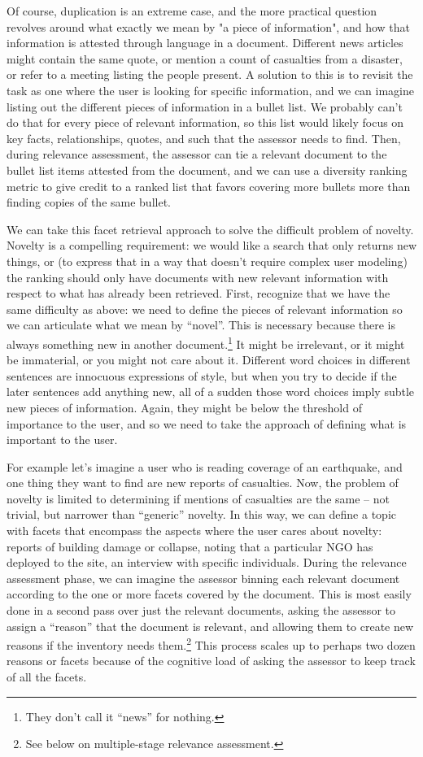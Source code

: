 \documentclass[nobib]{tufte-book}
\begin{document}
Of course, duplication is an extreme case, and the more practical question revolves around what exactly we mean by "a piece of information", and how that information is attested through language in a document.  Different news articles might contain the same quote, or mention a count of casualties from a disaster, or refer to a meeting listing the people present.  A solution to this is to revisit the task as one where the user is looking for specific information, and we can imagine listing out the different pieces of information in a bullet list.  We probably can't do that for every piece of relevant information, so this list would likely focus on key facts, relationships, quotes, and such that the assessor needs to find.  Then, during relevance assessment, the assessor can tie a relevant document to the bullet list items attested from the document, and we can use a diversity ranking metric to give credit to a ranked list that favors covering more bullets more than finding copies of the same bullet.

We can take this facet retrieval approach to solve the difficult problem of novelty.  Novelty is a compelling requirement: we would like a search that only returns new things, or (to express that in a way that doesn't require complex user modeling) the ranking should only have documents with new relevant information with respect to what has already been retrieved.  First, recognize that we have the same difficulty as above: we need to define the pieces of relevant information so we can articulate what we mean by ``novel''.  This is necessary because there is always something new in another document.\footnote{They don't call it ``news'' for nothing.}  It might be irrelevant, or it might be immaterial, or you might not care about it.  Different word choices in different sentences are innocuous expressions of style, but when you try to decide if the later sentences add anything new, all of a sudden those word choices imply subtle new pieces of information.  Again, they might be below the threshold of importance to the user, and so we need to take the approach of defining what is important to the user.  

For example let's imagine a user who is reading coverage of an earthquake, and one thing they want to find are new reports of casualties.  Now, the problem of novelty is limited to determining if mentions of casualties are the same -- not trivial, but narrower than ``generic'' novelty.  In this way, we can define a topic with facets that encompass the aspects where the user cares about novelty: reports of building damage or collapse, noting that a particular NGO has deployed to the site, an interview with specific individuals.  During the relevance assessment phase, we can imagine the assessor binning each relevant document according to the one or more facets covered by the document.  This is most easily done in a second pass over just the relevant documents, asking the assessor to assign a ``reason'' that the document is relevant, and allowing them to create new reasons if the inventory needs them.\footnote{See below on multiple-stage relevance assessment.}  This process scales up to perhaps two dozen reasons or facets because of the cognitive load of asking the assessor to keep track of all the facets.
\end{document}
